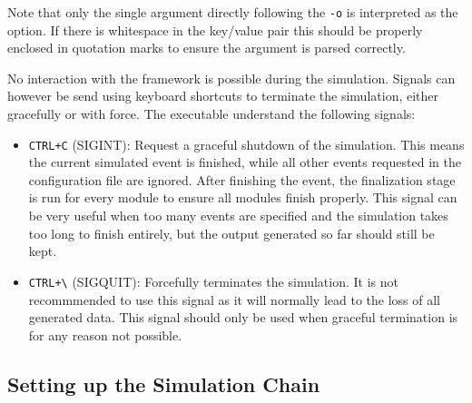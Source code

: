 \begin{itemize}
\begin{itemize}
\end{itemize}
Note that only the single argument directly following the \texttt{-o} is interpreted as the option. If there is whitespace in the key/value pair this should be properly enclosed in quotation marks to ensure the argument is parsed correctly.
\end{itemize}

No interaction with the framework is possible during the simulation. Signals can however be send using keyboard shortcuts to terminate the simulation, either gracefully or with force. The executable understand the following signals:
\begin{itemize}
\item \texttt{CTRL+C} (SIGINT): Request a graceful shutdown of the simulation. This means the current simulated event is finished, while all other events requested in the configuration file are ignored. After finishing the event, the finalization stage is run for every module to ensure all modules finish properly. This signal can be very useful when too many events are specified and the simulation takes too long to finish entirely, but the output generated so far should still be kept.
\item \texttt{CTRL+\textbackslash} (SIGQUIT): Forcefully terminates the simulation. It is not recommmended to use this signal as it will normally lead to the loss of all generated data. This signal should only be used when graceful termination is for any reason not possible.
\end{itemize}
\subsection{Setting up the Simulation Chain}
\label{sec:setting_up_simulation_chain}

